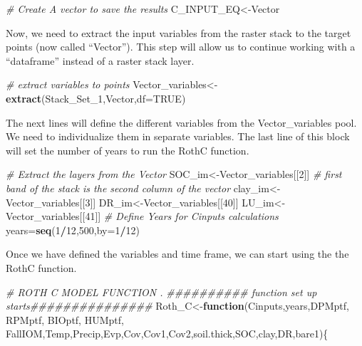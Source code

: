 \documentclass[
  10pt,
  b5paper,
]{book}
\newenvironment{Shaded}{\begin{snugshade}}{\end{snugshade}}
\newcommand{\CommentTok}[1]{\textcolor[rgb]{0.56,0.35,0.01}{\textit{#1}}}
\newcommand{\ControlFlowTok}[1]{\textcolor[rgb]{0.13,0.29,0.53}{\textbf{#1}}}
\newcommand{\DataTypeTok}[1]{\textcolor[rgb]{0.13,0.29,0.53}{#1}}
\newcommand{\DecValTok}[1]{\textcolor[rgb]{0.00,0.00,0.81}{#1}}
\newcommand{\KeywordTok}[1]{\textcolor[rgb]{0.13,0.29,0.53}{\textbf{#1}}}
\newcommand{\NormalTok}[1]{#1}
\newcommand{\OperatorTok}[1]{\textcolor[rgb]{0.81,0.36,0.00}{\textbf{#1}}}
\newcommand{\OtherTok}[1]{\textcolor[rgb]{0.56,0.35,0.01}{#1}}
\begin{document}
\begin{Shaded}
\begin{Highlighting}[]
\CommentTok{# Create A vector to save the results}
\NormalTok{C_INPUT_EQ<-Vector}
\end{Highlighting}
\end{Shaded}

Now, we need to extract the input variables from the raster stack to the target points (now called ``Vector''). This step will allow us to continue working with a ``dataframe'' instead of a raster stack layer.

\begin{Shaded}
\begin{Highlighting}[]
\CommentTok{# extract variables to points}
\NormalTok{Vector_variables<-}\KeywordTok{extract}\NormalTok{(Stack_Set_}\DecValTok{1}\NormalTok{,Vector,}\DataTypeTok{df=}\OtherTok{TRUE}\NormalTok{)}
\end{Highlighting}
\end{Shaded}

The next lines will define the different variables from the Vector\_variables pool. We need to individualize them in separate variables. The last line of this block will set the number of years to run the RothC function.

\begin{Shaded}
\begin{Highlighting}[]
\CommentTok{# Extract the layers from the Vector}
\NormalTok{SOC_im<-Vector_variables[[}\DecValTok{2}\NormalTok{]] }\CommentTok{# first band of the stack is the second column of the vector}
\NormalTok{clay_im<-Vector_variables[[}\DecValTok{3}\NormalTok{]]}
\NormalTok{DR_im<-Vector_variables[[}\DecValTok{40}\NormalTok{]]}
\NormalTok{LU_im<-Vector_variables[[}\DecValTok{41}\NormalTok{]]}
\CommentTok{# Define Years for Cinputs calculations}
\NormalTok{years=}\KeywordTok{seq}\NormalTok{(}\DecValTok{1}\OperatorTok{/}\DecValTok{12}\NormalTok{,}\DecValTok{500}\NormalTok{,}\DataTypeTok{by=}\DecValTok{1}\OperatorTok{/}\DecValTok{12}\NormalTok{)}
\end{Highlighting}
\end{Shaded}

Once we have defined the variables and time frame, we can start using the the RothC function.

\begin{Shaded}
\begin{Highlighting}[]
\CommentTok{# ROTH C MODEL FUNCTION .}
\CommentTok{########## function set up starts############### }
\NormalTok{Roth_C<-}\ControlFlowTok{function}\NormalTok{(Cinputs,years,DPMptf, RPMptf, BIOptf, HUMptf, FallIOM,Temp,Precip,Evp,Cov,Cov1,Cov2,soil.thick,SOC,clay,DR,bare1)\{}
\end{Highlighting}
\end{Shaded}
\end{document}
